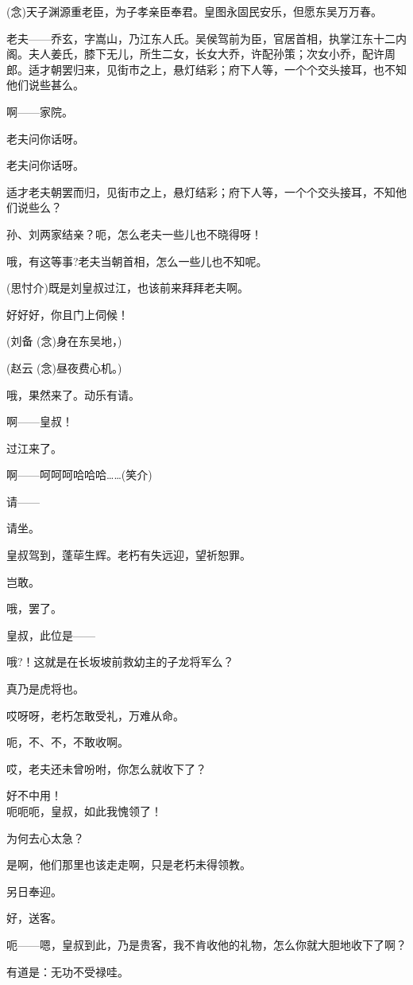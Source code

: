 (念)天子渊源重老臣，为子孝亲臣奉君。皇图永固民安乐，但愿东吴万万春。

老夫------乔玄，字嵩山，乃江东人氏。吴侯驾前为臣，官居首相，执掌江东十二内阁。夫人姜氏，膝下无儿，所生二女，长女大乔，许配孙策；次女小乔，配许周郎。适才朝罢归来，见街市之上，悬灯结彩；府下人等，一个个交头接耳，也不知他们说些甚么。

啊------家院。

老夫问你话呀。

老夫问你话呀。

适才老夫朝罢而归，见街市之上，悬灯结彩；府下人等，一个个交头接耳，不知他们说些么？

孙、刘两家结亲？呃，怎么老夫一些儿也不晓得呀！

哦，有这等事?老夫当朝首相，怎么一些儿也不知呢。

(思忖介)既是刘皇叔过江，也该前来拜拜老夫啊。

好好好，你且门上伺候！

(刘备 (念)身在东吴地，)

(赵云 (念)昼夜费心机。)

哦，果然来了。动乐有请。

啊------皇叔！

过江来了。

啊------呵呵呵哈哈哈\ldots{}\ldots{}(笑介)

请------

请坐。

皇叔驾到，蓬荜生辉。老朽有失远迎，望祈恕罪。

岂敢。

哦，罢了。

皇叔，此位是------

哦?！这就是在长坂坡前救幼主的子龙将军么？

真乃是虎将也。

哎呀呀，老朽怎敢受礼，万难从命。

呃，不、不，不敢收啊。

哎，老夫还未曾吩咐，你怎么就收下了？

好不中用！\\
呃呃呃，皇叔，如此我愧领了！

为何去心太急？

是啊，他们那里也该走走啊，只是老朽未得领教。

另日奉迎。

好，送客。

呃------嗯，皇叔到此，乃是贵客，我不肯收他的礼物，怎么你就大胆地收下了啊？

有道是：无功不受禄哇。

